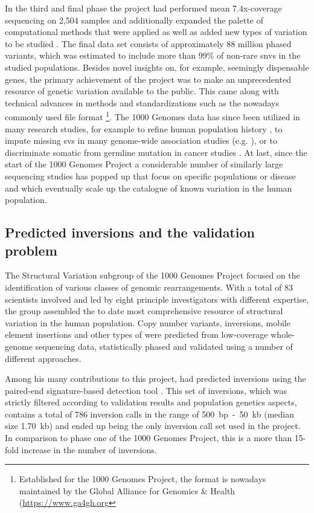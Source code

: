 In the third and final phase the project had performed mean 7.4x-coverage
sequencing on 2,504 samples and additionally expanded the palette of
computational methods that were applied as well as added new types of variation
to be studied \citep{Auton2015}. The final data set consists of approximately
88 million phased variants, which was estimated to include more than 99\% of
non-rare \acp{snv} in the studied populations. Besides novel insights on, for example,
seemingly dispensable genes, the primary achievement of the project was to make
an unprecedented resource of genetic variation available to the public. This
came along with technical advances in methods and standardizations such as the
nowadays commonly used file format \vcf\footnote{Established for the
1000 Genomes Project, the format is nowadays maintained by the Global Alliance
for Genomics \& Health (\url{https://www.ga4gh.org}}.
The 1000 Genomes data has since been utilized in many research studies, for
example to refine human population history \citep{Veeramah2014}, to
impute \citep{Howie2012} missing \acp{sv} in many genome-wide association studies
(e.g. \cite{Wood2014}), or to discriminate somatic from germline mutation in
cancer studies \citep{Hiltemann2015}. At last, since the start of the 1000
Genomes Project a considerable number of similarly large sequencing studies has
popped up that focus on specific populations \citep{UK10K,Sulem2015,Telenti2016}
or disease \citep{Campbell2017} and which eventually scale up the catalogue of
known variation in the human population.




\subsection{Predicted inversions and the validation problem}

The Structural Variation subgroup of the 1000 Genomes Project focused on the
identification of various classes of genomic rearrangements. With a total of 83
scientists involved and led by eight principle investigators with different
expertise, the group assembled the to date most comprehensive resource of
structural variation in the human population. Copy number variants, inversions,
mobile element insertions and other types of \sv were predicted from
low-coverage whole-genome sequencing data, statistically phased and
validated using a number of different approaches.

Among his many contributions to this project, \tobias had predicted inversions
using the paired-end signature-based \sv detection tool \delly. This set of
inversions, which was strictly filtered according to validation results and
population genetics aspects, contains a total of 786 inversion calls in the
range of 500~bp~-~50~kb (median size 1.70~kb) and ended up being the only
inversion call set used in the project. In comparison to phase one of the 1000
Genomes Project, this is a more than 15-fold increase in the number of
inversions.

